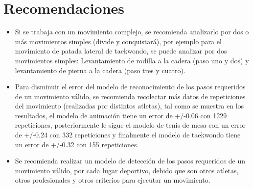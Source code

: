 \section{Recomendaciones} \label{ded:rec}
\begin{itemize}
\item Si se trabaja con un movimiento complejo, se recomienda analizarlo por dos o m\'as movimientos simples (divide y conquistar\'a), por ejemplo para el movimiento de patada lateral de taekwondo, se puede analizar por dos movimientos simples: Levantamiento de rodilla a la cadera (paso uno y dos) y levantamiento de pierna a la cadera (paso tres y cuatro).
\item Para disminuir el error del modelo de reconocimiento de los pasos requeridos de un  movimiento v\'alido, se recomienda recolectar m\'as  datos de  repeticiones del movimiento (realizadas por distintos atletas), tal como se muestra en los resultados, el modelo de animaci\'on tiene un error de +/-0.06  con 1229 repeticiones, posteriormente le sigue el modelo de tenis de mesa con un error de +/-0.24 con 332 repeticiones y finalmente el modelo de taekwondo tiene un error de +/-0.32 con 155 repeticiones.
\item Se recomienda realizar un modelo de detecci\'on de los pasos requeridos de un movimiento v\'alido, por cada lugar deportivo, debido que son otros atletas, otros profesionales y otros  criterios para ejecutar un movimiento.
\end{itemize}